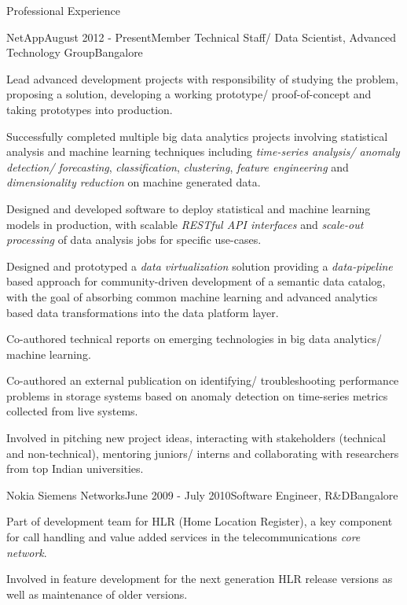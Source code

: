 \documentclass{resume} %
\begin{document}
\begin{rSection}{Professional Experience}

\begin{rSubsection}{NetApp}{August 2012 - Present}{Member Technical Staff/ Data Scientist, Advanced Technology Group}{Bangalore}

\item Lead advanced development projects with responsibility of studying the problem, proposing a solution, developing a working prototype/ proof-of-concept and taking prototypes into production.
\smallskip
\item Successfully completed multiple big data analytics projects involving statistical analysis and machine learning techniques including {\em time-series analysis/ anomaly detection/ forecasting}, {\em classification}, {\em clustering}, {\em feature engineering} and {\em dimensionality reduction} on machine generated data.
\smallskip
\item Designed and developed software to deploy statistical and machine learning models in production, with scalable {\em RESTful API interfaces} and {\em scale-out processing} of data analysis jobs for specific use-cases.
\item Designed and prototyped a {\em data virtualization} solution providing a {\em data-pipeline} based approach for community-driven development of a semantic data catalog, with the goal of absorbing common machine learning and advanced analytics based data transformations into the data platform layer.
\smallskip
\item Co-authored technical reports on emerging technologies in big data analytics/ machine learning.
\smallskip
\item Co-authored an external publication on identifying/ troubleshooting performance problems in storage systems based on anomaly detection on time-series metrics collected from live systems.
\smallskip
\item Involved in pitching new project ideas, interacting with stakeholders (technical and non-technical), mentoring juniors/ interns and collaborating with researchers from top Indian universities.

\end{rSubsection}


\begin{rSubsection}{Nokia Siemens Networks}{June 2009 - July 2010}{Software Engineer, R\&D}{Bangalore}
\item Part of development team for HLR (Home Location Register), a key component for call handling and value added services in the telecommunications {\em core network}.
\smallskip
\item Involved in feature development for the next generation HLR release versions as well as maintenance of older versions.
\end{rSubsection}

\end{rSection}
\end{document}
